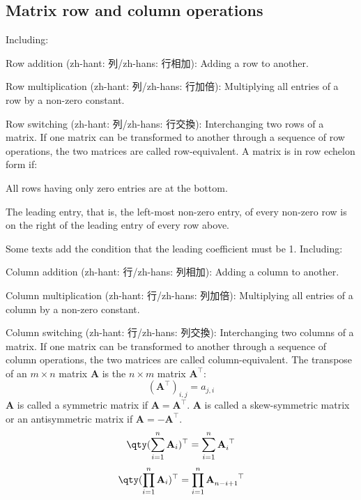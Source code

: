 \documentclass[a4paper,12pt]{report}
\begin{document}
\subsection{Matrix row and column operations}
Including:
\bit
\item Row addition (zh-hant: 列/zh-hans: 行相加): Adding a row to another.
\item Row multiplication (zh-hant: 列/zh-hans: 行加倍): Multiplying all entries of a row by a non-zero constant.
\item Row switching (zh-hant: 列/zh-hans: 行交換): Interchanging two rows of a matrix.
\eit
If one matrix can be transformed to another through a sequence of row operations, the two matrices are called row-equivalent.
A matrix is in row echelon form if:
\bit
\item All rows having only zero entries are at the bottom.
\item The leading entry, that is, the left-most non-zero entry, of every non-zero row is on the right of the leading entry of every row above.
\item Some texts add the condition that the leading coefficient must be 1.
\eit
{}
Including:
\bit
\item Column addition (zh-hant: 行/zh-hans: 列相加): Adding a column to another.
\item Column multiplication (zh-hant: 行/zh-hans: 列加倍): Multiplying all entries of a column by a non-zero constant.
\item Column switching (zh-hant: 行/zh-hans: 列交換): Interchanging two columns of a matrix.
\eit
If one matrix can be transformed to another through a sequence of column operations, the two matrices are called column-equivalent.
The transpose of an $m\times n$ matrix $\mathbf{A}$ is the $n\times m$ matrix $\mathbf{A}^\top$:
\[(\mathbf{A}^\top)_{i,j}=a_{j,i}\]
$\mathbf{A}$ is called a symmetric matrix if $\mathbf{A}=\mathbf{A}^\top$.
$\mathbf{A}$ is called a skew-symmetric matrix or an antisymmetric matrix if $\mathbf{A}=-\mathbf{A}^\top$.
\[\qty(\sum_{i=1}^n\mathbf{A}_i)^\top=\sum_{i=1}^n\mathbf{A}_i^{\phantom{i}\top}\]
\[\qty(\prod_{i=1}^n\mathbf{A}_i)^\top=\prod_{i=1}^n\mathbf{A}_{n-i+1}^{\phantom{n-i+1}\top}\]
\end{document}
